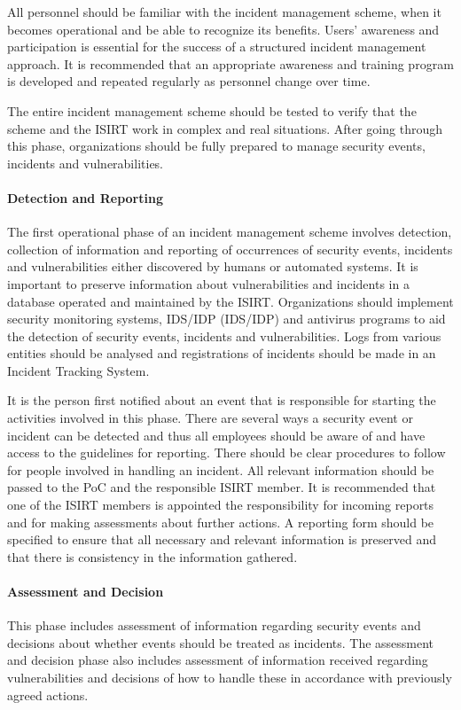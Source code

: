 All personnel should be familiar with the incident management scheme, when it becomes operational and be able to recognize its benefits. Users' awareness and participation is essential for the success of a structured incident management approach. It is recommended that an appropriate awareness and training program is developed and repeated regularly as personnel change over time.

The entire incident management scheme should be tested to verify that the scheme and the \ac{ISIRT} work in complex and real situations. After going through this phase, organizations should be fully prepared to manage security events, incidents and vulnerabilities.

\paragraph{Detection and Reporting} The first operational phase of an incident management scheme involves detection, collection of information and reporting of occurrences of security events, incidents and vulnerabilities either discovered by humans or automated systems. It is important to preserve information about vulnerabilities and incidents in a database operated and maintained by the \ac{ISIRT}. Organizations should implement security monitoring systems, \acl{IDS}/\acl{IDP} (\acs{IDS}/\acs{IDP}) and antivirus programs to aid the detection of security events, incidents and vulnerabilities. Logs from various entities should be analysed and registrations of incidents should be made in an Incident Tracking System. 

It is the person first notified about an event that is responsible for starting the activities involved in this phase. There are several ways a security event or incident can be detected and thus all employees should be aware of and have access to the guidelines for reporting. There should be clear procedures to follow for people involved in handling an incident. All relevant information should be passed to the \ac{PoC} and the responsible \ac{ISIRT} member. It is recommended that one of the \ac{ISIRT} members is appointed the responsibility for incoming reports and for making assessments about further actions.  A reporting form should be specified to ensure that all necessary and relevant information is preserved and that there is consistency in the information gathered. 

\paragraph{Assessment and Decision} This phase includes assessment of information regarding security events and decisions about whether events should be treated as incidents. The assessment and decision phase also includes assessment of information received regarding vulnerabilities and decisions of how to handle these in accordance with previously agreed actions.

